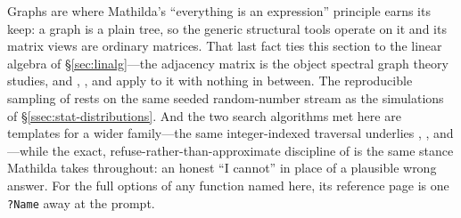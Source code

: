 Graphs are where Mathilda's ``everything is an expression'' principle earns its
keep: a graph is a plain  tree, so the generic structural tools operate
on it and its matrix views are ordinary matrices. That last fact ties this
section to the linear algebra of \S\ref{sec:linalg}---the adjacency matrix is
the object spectral graph theory studies, and , , and
 apply to it with nothing in between. The reproducible sampling of
 rests on the same seeded random-number stream as the simulations
of \S\ref{ssec:stat-distributions}. And the two search algorithms met here are
templates for a wider family---the same integer-indexed traversal underlies
, , and ---while
the exact, refuse-rather-than-approximate discipline of 
is the same stance Mathilda takes throughout: an honest ``I cannot'' in place of
a plausible wrong answer. For the full options of any function named here, its
reference page is one \texttt{?Name} away at the prompt.
